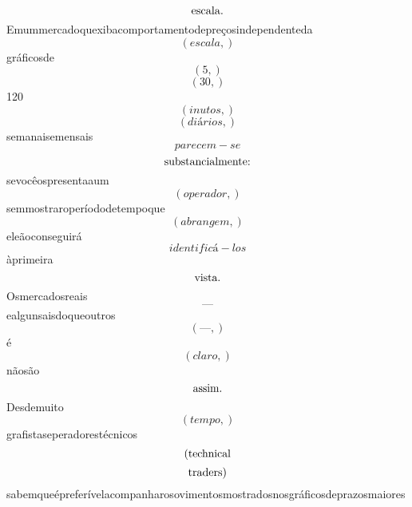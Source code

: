 \documentclass{article}
\begin{document}
\begin{equation}
$escala.$
\end{equation}Emummercadoquexibacomportamentodepreçosindependenteda\begin{equation}
\left( escala,\right)
\end{equation}gráficosde\begin{equation}
\left( 5,\right)
\end{equation}\begin{equation}
\left( 30,\right)
\end{equation}120\begin{equation}
\left( inutos,\right)
\end{equation}\begin{equation}
\left( diários,\right)
\end{equation}semanaisemensais\begin{equation}
parecem - se
\end{equation}\begin{equation}
$substancialmente:$
\end{equation}sevocêospresentaaum\begin{equation}
\left( operador,\right)
\end{equation}semmostraroperíododetempoque\begin{equation}
\left( abrangem,\right)
\end{equation}eleãoconseguirá\begin{equation}
identificá - los
\end{equation}àprimeira\begin{equation}
$vista.$
\end{equation}Osmercadosreais\begin{equation}
—
\end{equation}ealgunsaisdoqueoutros\begin{equation}
\left( —,\right)
\end{equation}é\begin{equation}
\left( claro,\right)
\end{equation}nãosão\begin{equation}
$assim.$
\end{equation}Desdemuito\begin{equation}
\left( tempo,\right)
\end{equation}grafistaseperadorestécnicos\begin{equation}
$(technical$
\end{equation}\begin{equation}
$traders)$
\end{equation}sabemqueépreferívelacompanharosovimentosmostradosnosgráficosdeprazosmaiores\begin{equation}

\end{equation}
\end{document}
